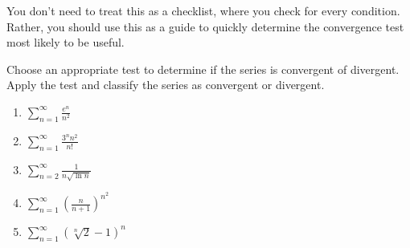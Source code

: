 You don't need to treat this as a checklist, where you check for every 
condition. Rather, you should use this as a guide to quickly determine the 
convergence test most likely to be useful. 

\begin{Exercise}[label = test]
Choose an appropriate test to determine if the series is convergent of 
divergent. Apply the test and classify the series as convergent or divergent.
\begin{enumerate}
\item $\sum_{n=1}^\infty \frac{e^n}{n^2}$
\item $\sum_{n=1}^\infty \frac{3^n n^2}{n!}$
\item $\sum_{n=2}^\infty \frac{1}{n\sqrt{\ln{n}}}$
\item $\sum_{n=1}^\infty \left( \frac{n}{n+1} \right)^{n^2}$
\item $\sum_{n=1}^\infty \left( \sqrt[n]{2} - 1\right)^n$
\vspace{75mm}
\end{enumerate}
\end{Exercise}

